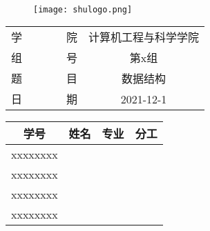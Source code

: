 
~

\vspace{10mm}


\begin{figure}[!htbp]
    \centering
    \texttt{[image: shulogo.png]}
\end{figure}


\centerline{}

\vspace{8mm}

\centerline{}

\vspace{8mm}


\vspace{8mm}

\begin{table}[!htbp]\large
    \centering
    \begin{tabular}{r c}
        学~~~~~~~~院    & 计算机工程与科学学院\\  \cmidrule(l){2-2} 
        组~~~~~~~~号    & 第x组\\               \cmidrule(l){2-2} 
        题~~~~~~~~目    & 数据结构\\            \cmidrule(l){2-2} 
        日~~~~~~~~期    & 2021-12-1\\           \cmidrule(l){2-2} 
    \end{tabular}
\end{table}

\vspace{8mm}

\begin{table*}[!htbp]\large
    \centering
    \begin{tabular}{|c|c|c|m{8cm}<{\centering}|}
    \hline
    学号       & 姓名 & 专业 & 分工 \\ 
    \hline
    xxxxxxxx &    &    &     \\ 
    \hline
    xxxxxxxx &    &    &     \\ 
    \hline
    xxxxxxxx &    &    &     \\ 
    \hline
    xxxxxxxx &    &    &     \\
    \hline
    \end{tabular}
\end{table*}
